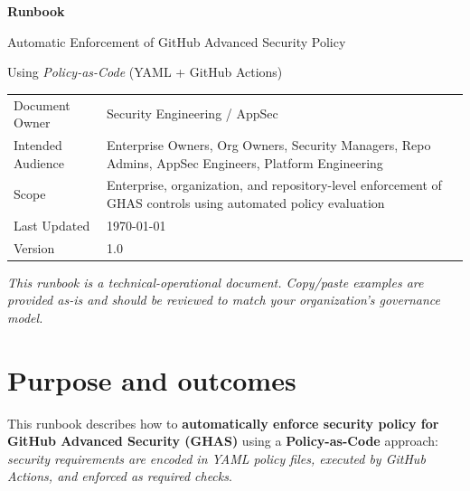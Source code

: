 \documentclass[11pt]{article}
\begin{document}
\hypersetup{pageanchor=false}%
\begin{titlepage}
  \centering
  \vspace*{1.2in}
  {\Huge \bfseries Runbook \par}
  \vspace{0.2in}
  {\LARGE Automatic Enforcement of GitHub Advanced Security Policy \par}
  \vspace{0.15in}
  {\Large Using \textit{Policy-as-Code} (YAML + GitHub Actions) \par}
  \vspace{0.6in}

  \begin{minipage}{0.9\textwidth}
  \small
  \begin{tabular}{@{}p{}p{}@{}}
    \toprule
    Document Owner & Security Engineering / AppSec \\
    Intended Audience & Enterprise Owners, Org Owners, Security Managers, Repo Admins, AppSec Engineers, Platform Engineering \\
    Scope & Enterprise, organization, and repository-level enforcement of GHAS controls using automated policy evaluation \\
    Last Updated & \today \\
    Version & 1.0 \\
    \bottomrule
  \end{tabular}
  \end{minipage}

  \vfill
  {\small \textit{This runbook is a technical-operational document. Copy/paste examples are provided as-is and should be reviewed to match your organization’s governance model.} \par}
\end{titlepage}\hypersetup{pageanchor=true}

\tableofcontents
\newpage

\section{Purpose and outcomes}

This runbook describes how to \textbf{automatically enforce security policy for GitHub Advanced Security (GHAS)} using a \textbf{Policy-as-Code} approach: \textit{security requirements are encoded in YAML policy files, executed by GitHub Actions, and enforced as required checks}.
\end{document}
